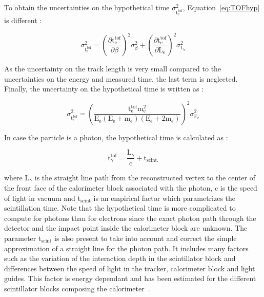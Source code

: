 \documentclass[main.tex]{subfiles}
\begin{document}
\bigskip


\NI To obtain the uncertainties on the hypothetical time $\sigma^\text{2}_{\text{t}_{\text{e}}^{\text{tof}}}$, Equation~\ref{eq:TOFhyp} is different : 


\begin{equation}
\sigma^\text{2}_{\text{t}_{\text{e}}^{\text{tof}}} = \left( \frac{\partial \text{t}_\text{e}^{\text{tof}}}{\partial \beta}  \right)^\text{2} \sigma^\text{2}_\beta + \left( \frac{\partial \text{t}_\text{e}^{\text{tof}}}{\partial \text{L}_\text{e}}  \right)^\text{2} \sigma^\text{2}_{\text{L}_\text{e}}
\end{equation}


\bigskip


\NI As the uncertainty on the track length is very small compared to the uncertainties on the energy and measured time, the last term is neglected. Finally, the uncertainty on the hypothetical time is written as : 


\begin{equation}
\sigma^\text{2}_{\text{t}_{\text{e}}^{\text{tof}}} = \left( \frac{\text{t}_\text{e}^{\text{tof}} \text{m}_\text{e}^\text{2}}{\text{E}_\text{e} (\text{E}_\text{e} + \text{m}_\text{e})(\text{E}_\text{e} + \text{2m}_\text{e})}  \right) ^\text{2} \sigma^\text{2}_{\text{E}_\text{e}}
\end{equation}


\bigskip


\NI In case the particle is a photon, the hypothetical time is calculated as : 


\begin{equation}
\text{t}_\gamma^{\text{tof}} = \frac{\text{L}_\gamma}{\text{c}} + \text{t}_{\text{scint.}} 
\end{equation}

\bigskip


\NI where L$_{\gamma}$ is the straight line path from the reconstructed vertex to the center of the front face of the calorimeter block associated with the photon, c is the speed of light in vacuum and t$_{\text{scint}}$ is an empirical factor which parametrizes the scintillation time. Note that the hypothetical time is more complicated to compute for photons than for electrons since the exact photon path through the detector and the impact point inside the calorimeter block are unknown. The parameter t$_{\text{scint}}$ is also present to take into account and correct the simple approximation of a straight line for the photon path. It includes many factors such as the variation of the interaction depth in the scintillator block and differences between the speed of light in the tracker, calorimeter block and light guides. This factor is energy dependant and has been estimated for the different scintillator blocks composing the calorimeter~\cite{GammaReconstructionHereward}.
\end{document}
